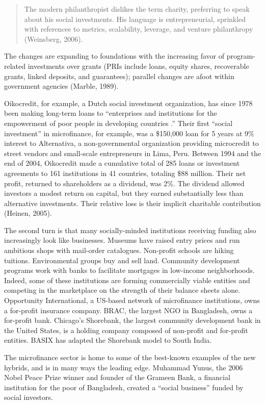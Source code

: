 \documentclass[
]{article}
\begin{document}
\begin{quote}
The modern philanthropist dislikes the term charity, preferring to speak
about his social investments. His language is entrepreneurial, sprinkled
with references to metrics, scalability, leverage, and venture
philanthropy (Weinsberg, 2006).
\end{quote}

The changes are expanding to foundations with the increasing favor of
program-related investments over grants (PRIs include loans, equity
shares, recoverable grants, linked deposits, and guarantees); parallel
changes are afoot within government agencies (Marble, 1989).

Oikocredit, for example, a Dutch social investment organization, has
since 1978 been making long-term loans to ``enterprises and institutions
for the empowerment of poor people in developing countries .'' Their
first ``social investment'' in microfinance, for example, was a
\$150,000 loan for 5 years at 9\% interest to Alternativa, a
non-governmental organization providing microcredit to street vendors
and small-scale entrepreneurs in Lima, Peru. Between 1994 and the end of
2004, Oikocredit made a cumulative total of 285 loans or investment
agreements to 161 institutions in 41 countries, totaling \$88 million.
Their net profit, returned to shareholders as a dividend, was 2\%. The
dividend allowed investors a modest return on capital, but they earned
substantially less than alternative investments. Their relative loss is
their implicit charitable contribution (Heinen, 2005).

The second turn is that many socially-minded institutions receiving
funding also increasingly look like businesses. Museums have raised
entry prices and run ambitious shops with mail-order catalogues.
Non-profit schools are hiking tuitions. Environmental groups buy and
sell land. Community development programs work with banks to facilitate
mortgages in low-income neighborhoods. Indeed, some of these
institutions are forming commercially viable entities and competing in
the marketplace on the strength of their balance sheets alone.
Opportunity International, a US-based network of microfinance
institutions, owns a for-profit insurance company. BRAC, the largest NGO
in Bangladesh, owns a for-profit bank. Chicago's Shorebank, the largest
community development bank in the United States, is a holding company
composed of non-profit and for-profit entities. BASIX has adapted the
Shorebank model to South India.

The microfinance sector is home to some of the best-known examples of
the new hybrids, and is in many ways the leading edge. Muhammad Yunus,
the 2006 Nobel Peace Prize winner and founder of the Grameen Bank, a
financial institution for the poor of Bangladesh, created a ``social
business'' funded by social investors.
\end{document}
